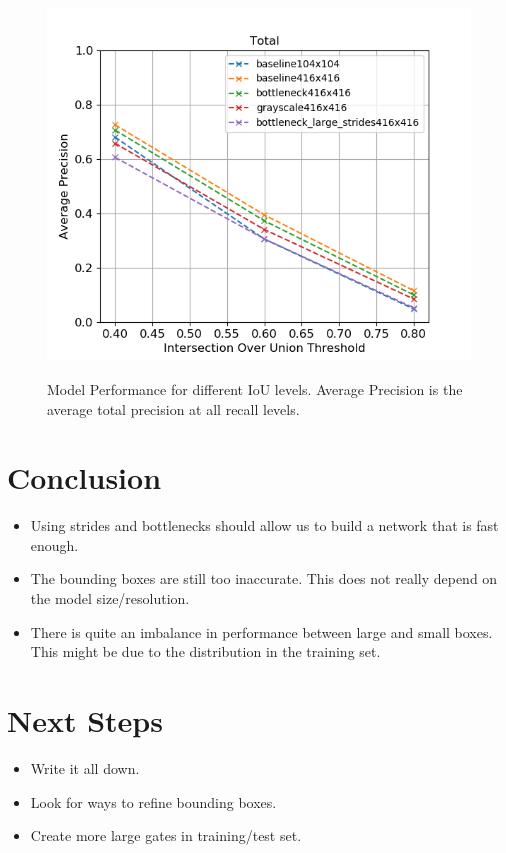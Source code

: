 \documentclass{article}
\begin{document}
\begin{figure}[htbp]

		\includegraphics[width=0.5\linewidth]{iou}
		\label{fig:iou}
		\caption{Model Performance for different IoU levels. Average Precision is the average total precision at all recall levels.}
\end{figure}

\newpage


\section{Conclusion}
\begin{itemize}
	\item Using strides and bottlenecks should allow us to build a network that is fast enough.
	\item The bounding boxes are still too inaccurate. This does not really depend on the model size/resolution.
	\item There is quite an imbalance in performance between large and small boxes. This might be due to the distribution in the training set. 
\end{itemize}

\section{Next Steps}
\begin{itemize}
	\item Write it all down.
	\item Look for ways to refine bounding boxes.
	\item Create more large gates in training/test set.
\end{itemize}
\end{document}
